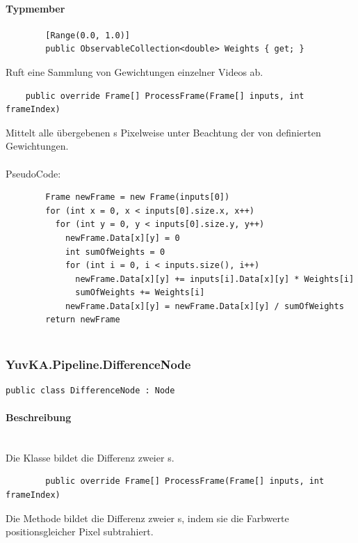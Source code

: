 \paragraph{Typmember}
\begin{itemize}

	\begin{verbatim}
		[Range(0.0, 1.0)]
		public ObservableCollection<double> Weights { get; }
	\end{verbatim}
	Ruft eine Sammlung von Gewichtungen einzelner Videos ab.

	\begin{verbatim}
	public override Frame[] ProcessFrame(Frame[] inputs, int frameIndex)
	\end{verbatim}
	Mittelt alle übergebenen s Pixelweise unter Beachtung der von  definierten Gewichtungen.\\~\\
	PseudoCode:
	\begin{verbatim}
		Frame newFrame = new Frame(inputs[0])
		for (int x = 0, x < inputs[0].size.x, x++)
		  for (int y = 0, y < inputs[0].size.y, y++)
		    newFrame.Data[x][y] = 0
		    int sumOfWeights = 0
		    for (int i = 0, i < inputs.size(), i++)
		      newFrame.Data[x][y] += inputs[i].Data[x][y] * Weights[i]
		      sumOfWeights += Weights[i]
		    newFrame.Data[x][y] = newFrame.Data[x][y] / sumOfWeights
		return newFrame
		
	\end{verbatim}
	
\end{itemize}

\subsubsection{YuvKA.Pipeline.DifferenceNode}

\begin{verbatim}
public class DifferenceNode : Node
\end{verbatim}

\paragraph{Beschreibung}~\\
Die Klasse  bildet die Differenz zweier s.

\begin{itemize}
	\begin{verbatim}
		public override Frame[] ProcessFrame(Frame[] inputs, int frameIndex)
	\end{verbatim}
Die Methode  bildet die Differenz zweier s, indem sie die Farbwerte positionsgleicher Pixel subtrahiert.

\end{itemize}

